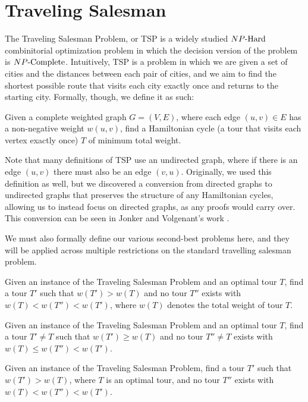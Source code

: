 \chapter{Traveling Salesman}
The Traveling Salesman Problem, or TSP is a widely studied ${NP\text{-Hard{}}}$ combinitorial optimization problem in which the decision version of the problem is ${NP\text{-Complete}}{}$. Intuitively, TSP is a problem in which we are given a set of cities and the distances between each pair of cities, and we aim to find the shortest possible route that visits each city exactly once and returns to the starting city. Formally, though, we define it as such:
\begin{definition}
Given a complete weighted graph $G = (V, E)$, where each edge $(u, v) \in E$ has a non-negative weight $w(u, v)$, find a Hamiltonian cycle (a tour that visits each vertex exactly once) $T$ of minimum total weight.
\end{definition}  

Note that many definitions of TSP use an undirected graph, where if there is an edge $(u,v)$ there must also be an edge $(v,u)$. Originally, we used this definition as well, but we discovered a conversion from directed graphs to undirected graphs that preserves the structure of any Hamiltonian cycles, allowing us to instead focus on directed graphs, as any proofs would carry over. This conversion can be seen in Jonker and Volgenant's work \cite{JONKER1983161}.

We must also formally define our various second-best problems here, and they will be applied across multiple restrictions on the standard travelling salesman problem.

\begin{definition}
Given an instance of the Traveling Salesman Problem and an optimal tour $T$, find a tour $T'$ such that $w(T') > w(T)$ and no tour $T''$ exists with $w(T) < w(T'') < w(T')$, where $w(T)$ denotes the total weight of tour $T$.
\end{definition}

\begin{definition}
Given an instance of the Traveling Salesman Problem and an optimal tour $T$, find a tour $T' \neq T$ such that $w(T') \geq w(T)$ and no tour $T'' \neq T$ exists with $w(T) \leq w(T'') < w(T')$.
\end{definition}

\begin{definition}
Given an instance of the Traveling Salesman Problem, find a tour $T'$ such that $w(T') > w(T)$, where $T$ is an optimal tour, and no tour $T''$ exists with $w(T) < w(T'') < w(T')$.
\end{definition}

